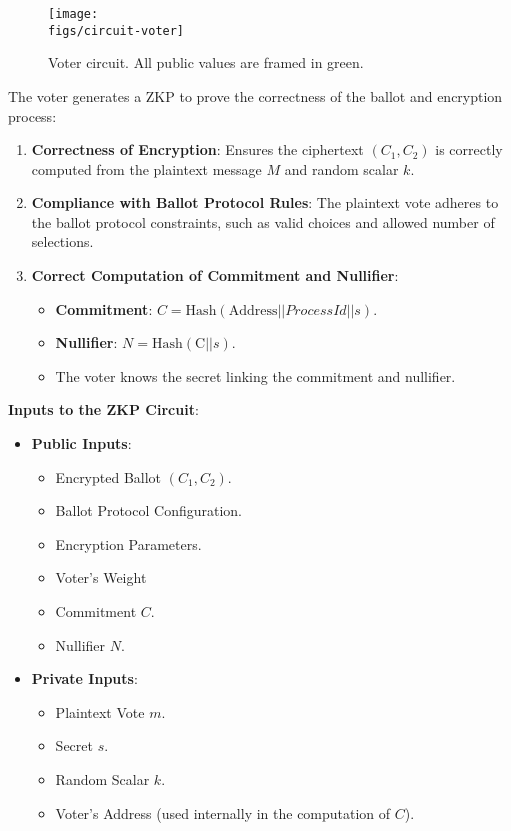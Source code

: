 \begin{figure}[h]
	\centerline{\texttt{[image: \\figs/circuit-voter]}}
	\caption{Voter circuit. All public values are framed in green.}
	\label{fig:circuit-voter}
\end{figure}

	The voter generates a ZKP to prove the correctness of the ballot and encryption process:

\begin{enumerate}
	\item \textbf{Correctness of Encryption}: Ensures the ciphertext $(C_1, C_2)$ is correctly computed from the plaintext message $M$ and random scalar $k$.
	\item \textbf{Compliance with Ballot Protocol Rules}: The plaintext vote adheres to the ballot protocol constraints, such as valid choices and allowed number of selections.
	\item \textbf{Correct Computation of Commitment and Nullifier}:
	\begin{itemize}
		\item \textbf{Commitment}: $C = \text{Hash} (\text{Address} || ProcessId || s).$
		\item \textbf{Nullifier}: $N = \text{Hash}(\text{C} || s)$.
		\item The voter knows the secret linking the commitment and nullifier.
	\end{itemize}
\end{enumerate}

\textbf{Inputs to the ZKP Circuit}:

\begin{itemize}
	\item \textbf{Public Inputs}:
	\begin{itemize}
		\item Encrypted Ballot $(C_1, C_2)$.
		\item Ballot Protocol Configuration.
		\item Encryption Parameters.
		\item Voter's Weight
		\item Commitment $C$.
		\item Nullifier $N$.
	\end{itemize}
	\item \textbf{Private Inputs}:
	\begin{itemize}
		\item Plaintext Vote $m$.
		\item Secret $s$.
		\item Random Scalar $k$.
		\item Voter's Address (used internally in the computation of $C$).
	\end{itemize}
\end{itemize}

